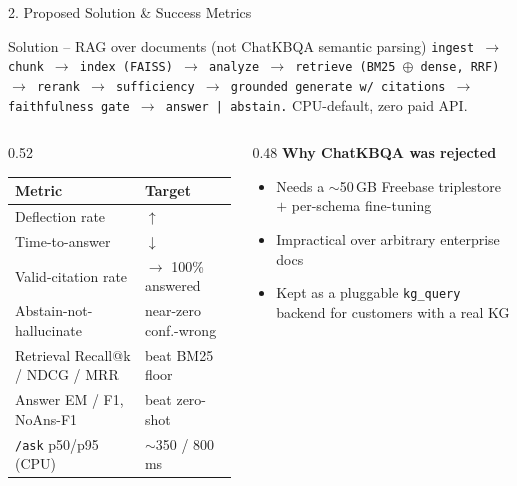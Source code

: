 \documentclass[10pt,aspectratio=169]{beamer}
\begin{document}
\begin{frame}{2. Proposed Solution \& Success Metrics}
\begin{block}{Solution -- RAG over documents (not ChatKBQA semantic parsing)}
\footnotesize \texttt{ingest $\rightarrow$ chunk $\rightarrow$ index (FAISS) $\rightarrow$ analyze $\rightarrow$ retrieve (BM25 $\oplus$ dense, RRF) $\rightarrow$ rerank $\rightarrow$ sufficiency $\rightarrow$ grounded generate w/ citations $\rightarrow$ faithfulness gate $\rightarrow$ answer | abstain.} CPU-default, zero paid API.
\end{block}

\begin{columns}[T]
\begin{column}{0.52\textwidth}
\begin{table}[h]
\centering\scriptsize
\begin{tabular}{ll}
\toprule
\textbf{Metric} & \textbf{Target} \\
\midrule
Deflection rate & $\uparrow$ \\
Time-to-answer & $\downarrow$ \\
Valid-citation rate & $\rightarrow$ 100\% answered \\
Abstain-not-hallucinate & near-zero conf.-wrong \\
Retrieval Recall@k / NDCG / MRR & beat BM25 floor \\
Answer EM / F1, NoAns-F1 & beat zero-shot \\
\texttt{/ask} p50/p95 (CPU) & $\sim$350 / 800 ms \\
\bottomrule
\end{tabular}
\end{table}
\end{column}
\begin{column}{0.48\textwidth}
\textbf{Why ChatKBQA was rejected}
\begin{itemize}\scriptsize
  \item Needs a $\sim$50\,GB Freebase triplestore $+$ per-schema fine-tuning
  \item Impractical over arbitrary enterprise docs
  \item Kept as a pluggable \texttt{kg\_query} backend for customers with a real KG
\end{itemize}
\end{column}
\end{columns}
\end{frame}
\end{document}
